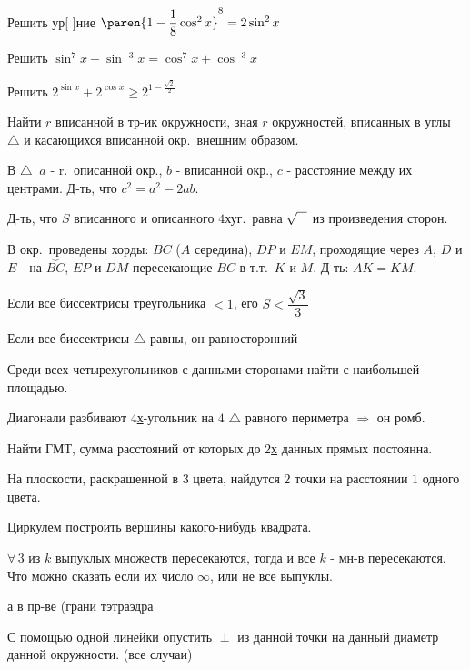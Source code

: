 \documentclass{article}
\newcommand{\strikethrough}[1]{}  %
\begin{document}
\problem  %
Решить ур[ ]ние
$\paren{1 - \dfrac{1}{8} \cos^{2}{x}}^{8} = 2 \sin^{2}{x}$


\problem  %
Решить $\sin^{7}{x} + \sin^{-3}{x} = \cos^{7}{x} + \cos^{-3}{x}$


\problem  %
Решить $2^{\sin{x}} + 2^{\cos{x}} \geq 2^{1 - \frac{\sqrt{2}}{2}}$


\problem  %
Найти $r$ вписанной в тр-ик окружности, зная $r$ окружностей, вписанных в углы $\triangle$ и касающихся вписанной окр.\ внешним образом.


\problem  %
В $\triangle \:$ $a$ - r.\ описанной окр., $b$ - вписанной окр., $c$ - расстояние между их центрами.
Д-ть, что $c^2 = a^2 - 2 a b$.


\problem  %
Д-ть, что $S$ вписанного и описанного $4$хуг.\ равна $\sqrt{\vphantom{A} \hphantom{A}}$ из произведения сторон.


\problem  %
\newcommand{\invarc}[1]{\stackrel{\smile}{#1}}
В окр.\ проведены хорды: $BC$ ($A$ середина), $DP$ и $EM$, проходящие через $A$,
$D$ и $E$ - на $\invarc{BC}$, $EP$ и $DM$ пересекающие $BC$ в т.т.\ $K$ и $M$.
Д-ть: $AK = KM$.


\problem  %
Если все биссектрисы треугольника $< 1$, его $S < \dfrac{\sqrt{3}}{3}$


\problem  %
Если все биссектрисы $\triangle$ равны, он \strikethrough{равнобедренный} равносторонний


\problem  %
Среди всех четырехугольников с данными сторонами найти с наибольшей площадью.


\problem  %
Диагонали разбивают $4$\underline{х}-угольник на $4$ $\triangle$ равного периметра $\Rightarrow$ он ромб.


\problem  %
Найти ГМТ, сумма расстояний от которых до $2$\underline{х} данных прямых постоянна.


\problem  %
На плоскости, раскрашенной в $3$ цвета, найдутся $2$ точки на расстоянии $1$ одного цвета.


\problem  %
Циркулем построить вершины какого-нибудь квадрата.


\problem  %
$\forall \, 3$ из $k$ выпуклых множеств пересекаются, тогда и все $k$ - мн-в пересекаются.
Что можно сказать если их число $\infty$, или не все выпуклы.

а в пр-ве (грани тэтраэдра


\problem  %
С помощью одной линейки опустить $\perp$ из данной точки на данный диаметр данной окружности. (все случаи)
\end{document}
